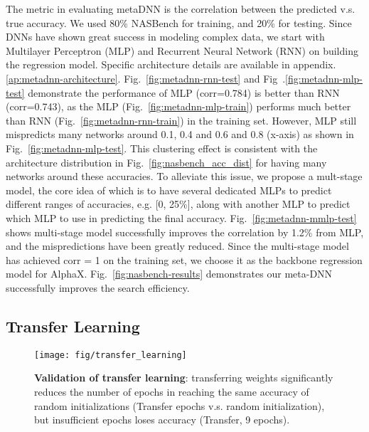 \documentclass[10pt,twocolumn,letterpaper]{article}
\begin{document}
The metric in evaluating metaDNN is the correlation between the predicted v.s. true accuracy. We used 80\% NASBench for training, and 20\% for testing. Since DNNs have shown great success in modeling complex data, we start with Multilayer Perceptron (MLP) and Recurrent Neural Network (RNN) on building the regression model. Specific architecture details are available in appendix.\ref{ap:metadnn-architecture}.
Fig.~\ref{fig:metadnn-rnn-test} and Fig~.\ref{fig:metadnn-mlp-test} demonstrate the performance of MLP (corr=0.784) is  better than RNN (corr=0.743), as the MLP (Fig.~\ref{fig:metadnn-mlp-train}) performs much better than RNN (Fig.~\ref{fig:metadnn-rnn-train}) in the training set. However, MLP still mispredicts many networks around 0.1, 0.4 and 0.6 and 0.8 (x-axis) as shown in Fig.~\ref{fig:metadnn-mlp-test}. This clustering effect is consistent with the architecture distribution in Fig.~\ref{fig:nasbench_acc_dist} for having many networks around these accuracies. To alleviate this issue, we propose a mult-stage model, the core idea of which is to have several dedicated MLPs to predict different ranges of accuracies, e.g. [0, 25\%], along with another MLP to predict which MLP to use in predicting the final accuracy.
Fig.~\ref{fig:metadnn-mmlp-test} shows multi-stage model successfully improves the correlation by 1.2\% from MLP, and the mispredictions have been greatly reduced. Since the multi-stage model has achieved corr = 1 on the training set, we choose it as the backbone regression model for AlphaX. Fig.~\ref{fig:nasbench-results} demonstrates our meta-DNN successfully improves the search efficiency.

\subsection{Transfer Learning}
\begin{figure}
  \begin{center}
    \texttt{[image: fig/transfer\_learning]}
  \end{center}
  \caption{\textbf{Validation of transfer learning}: transferring weights significantly reduces the number of epochs in reaching the same accuracy of random initializations (Transfer  epochs v.s. random initialization), but insufficient epochs loses accuracy (Transfer, 9 epochs).}
  \label{fig:transfer_learning}
\end{figure}
\end{document}

